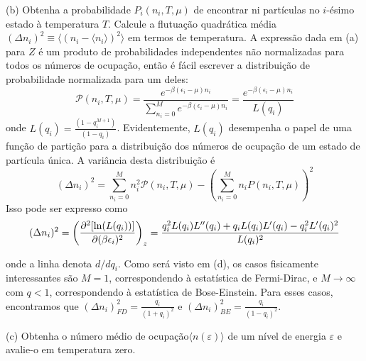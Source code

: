 \documentclass[12pt]{article}
\begin{document}
(b) Obtenha a probabilidade $P_i(n_i, T, \mu)$ de encontrar ni partículas no $i$-ésimo estado à temperatura $T$. Calcule a flutuação quadrática média $(\Delta n_i)^2 \equiv \langle (n_i - \langle n_i \rangle)^2 \rangle$ em termos de temperatura.
A expressão dada em (a) para $Z$ é um produto de probabilidades independentes não normalizadas para todos os números de ocupação, então é fácil escrever a distribuição de probabilidade normalizada para um deles:
\[
\mathcal{P}(n_i, T, \mu) = \frac{e^{-\beta (\epsilon_i - \mu) n_i}}{\sum_{n_i=0}^M e^{-\beta (\epsilon_i - \mu) n_i}} = \frac{e^{-\beta (\epsilon_i - \mu) n_i}}{L(q_i)}
\]
onde $L(q_i) = \frac{(1 - q_i^{M+1})}{(1 - q_i)}$. Evidentemente, $L(q_i) $ desempenha o papel de uma função de partição para a distribuição dos números de ocupação de um estado de partícula única. A variância desta distribuição é
\[
(\Delta n_i)^2 = \sum_{n_i = 0}^M n_i^2 \mathcal{P}(n_i, T, \mu) - \left( \sum_{n_i = 0}^M n_i P(n_i, T, \mu) \right)^2
\]
Isso pode ser expresso como
\[
(\Delta n_i)^2 = \left( \frac{\partial^2 [\ln(L(q_i))]}{\partial (\beta \epsilon_i)^2} \right)_{z} 
= \frac{q_i^2 L(q_i) L''(q_i) + q_i L(q_i) L'(q_i) - q_i^2 L'(q_i)^2}{L(q_i)^2} \\
\]

onde a linha denota $d/dq_i$. Como será visto em (d), os casos fisicamente interessantes são $M = 1$, correspondendo à estatística de Fermi-Dirac, e $M \rightarrow \infty$ com $q < 1$, correspondendo à estatística de Bose-Einstein. Para esses casos, encontramos que $(\Delta n_i)^2_{FD} = \frac{q_i}{(1 + q_i)^2} \text{ e } (\Delta n_i)^2_{BE} = \frac{q_i}{(1 - q_i)^2}$.

 
(c) Obtenha o número médio de ocupação$ \langle n(\varepsilon) \rangle$ de um nível de energia $\varepsilon$ e avalie-o em temperatura zero.
\end{document}
